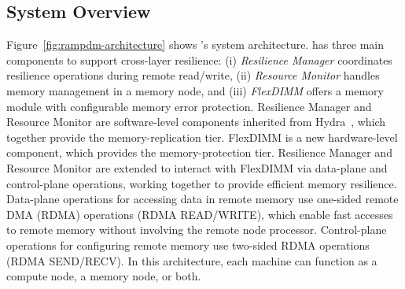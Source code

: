 \subsection{System Overview}

Figure~\ref{fig:rampdm-architecture} shows \rampdm's system architecture. 
\rampdm has three main components to support cross-layer resilience: 
(i) \emph{Resilience Manager} coordinates resilience operations during remote read/write, 
(ii) \emph{Resource Monitor} handles memory management in a memory node, and 
(iii) \emph{FlexDIMM} offers a memory module with configurable memory error protection. 
Resilience Manager and Resource Monitor are software-level components inherited from Hydra~\cite{lee:hydra:fast:2022}, which together provide the memory-replication tier.
FlexDIMM is a new hardware-level component, which provides the memory-protection tier.
Resilience Manager and Resource Monitor are extended to interact with FlexDIMM via data-plane and control-plane operations, working together to provide efficient memory resilience.
Data-plane operations for accessing data in remote memory use one-sided remote DMA (RDMA) operations (RDMA READ/WRITE), which enable fast accesses to remote memory without involving the remote node processor.
Control-plane operations for configuring remote memory use two-sided RDMA operations (RDMA SEND/RECV). 
In this architecture, each machine can function as a compute node, a memory node, or both. 
